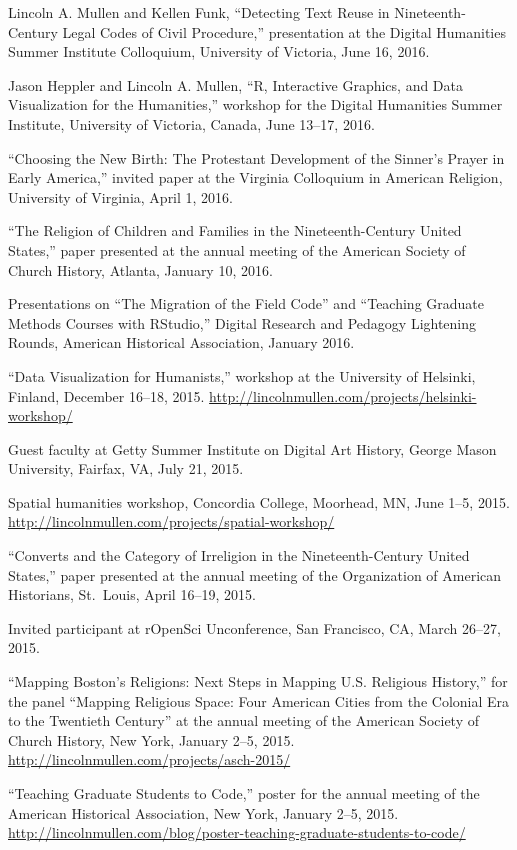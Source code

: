 \documentclass[11pt]{article}
\begin{document}
Lincoln A. Mullen and Kellen Funk, ``Detecting Text Reuse in Nineteenth-Century 
Legal Codes of Civil Procedure,'' presentation at the Digital Humanities 
Summer Institute Colloquium, University of Victoria, June 16, 2016.

Jason Heppler and Lincoln A. Mullen, ``R, Interactive Graphics, and Data 
Visualization for the Humanities,'' workshop for the Digital Humanities Summer 
Institute, University of Victoria, Canada, June 13--17, 2016.  

``Choosing the New Birth: The Protestant Development of the Sinner's Prayer in 
Early America,'' invited paper at the Virginia Colloquium in American 
Religion, University of Virginia, April 1, 2016.

``The Religion of Children and Families in the Nineteenth-Century United 
States,'' paper presented at the annual meeting of the American Society of 
Church History, Atlanta, January 10, 2016.

Presentations on ``The Migration of the Field Code'' and ``Teaching 
Graduate Methods Courses with RStudio,'' Digital Research and Pedagogy 
Lightening Rounds, American Historical Association, January 2016.

``Data Visualization for Humanists,'' workshop at the University of Helsinki, 
Finland, December 16--18, 2015. 
\url{http://lincolnmullen.com/projects/helsinki-workshop/}

Guest faculty at Getty Summer Institute on 
Digital Art History, George Mason University, Fairfax, VA, July 21, 2015.

Spatial humanities workshop, Concordia College, Moorhead, MN, June 1--5, 2015.  
\url{http://lincolnmullen.com/projects/spatial-workshop/}

``Converts and the Category of Irreligion in the Nineteenth-Century
United States,'' paper presented at the annual meeting of the
Organization of American Historians, St.~Louis, April 16--19, 2015.

Invited participant at rOpenSci Unconference, San Francisco, CA, March 26--27, 2015.

``Mapping Boston's Religions: Next Steps in Mapping U.S. Religious History,'' 
for the panel ``Mapping Religious Space: Four American Cities from the 
Colonial Era to the Twentieth Century'' at the annual meeting of the American 
Society of Church History, New York, January 2--5, 2015.  
\url{http://lincolnmullen.com/projects/asch-2015/}

``Teaching Graduate Students to Code,'' poster for the annual meeting of the
American Historical Association, New York, January 2--5, 2015.
\url{http://lincolnmullen.com/blog/poster-teaching-graduate-students-to-code/}
\end{document}
